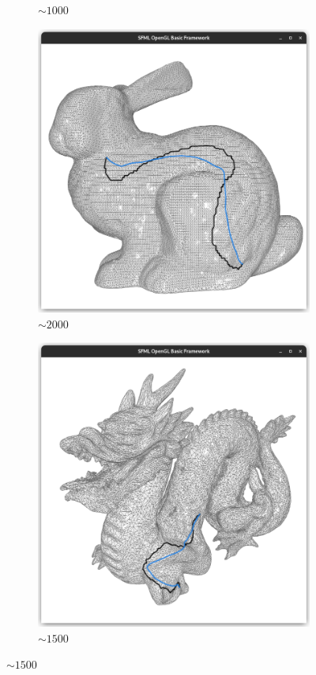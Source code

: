 \documentclass{stdlocal}
\begin{document}
\begin{figure}
\begin{subfigure}[b]{0.24\linewidth}
    \caption{$\sim 1000$}
  \end{subfigure}
  \begin{subfigure}[b]{0.24\linewidth}
    \centering
    \includegraphics[width=\linewidth,trim={15px 20 15 50},clip]{images/bunny-smooth-0.5.png}
    \caption{$\sim 2000$}
  \end{subfigure}
  \begin{subfigure}[b]{0.24\linewidth}
    \centering
    \includegraphics[width=\linewidth,trim={15px 20 15 50},clip]{images/dragon-smooth-0.5.png}
    \caption{$\sim 1500$}
  \end{subfigure}


\end{figure}
\end{document}
